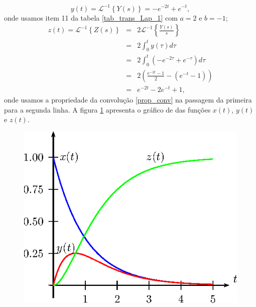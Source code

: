 \begin{equation}
y(t)=\mathcal{L}^{-1}\left\{Y(s)\right\}=-e^{-2t}+e^{-t},
\end{equation}
onde usamos item 11 da tabela \ref{tab_trans_Lap_1} com $a=2$ e $b=-1$;
\begin{eqnarray*}
z(t)=\mathcal{L}^{-1}\left\{Z(s)\right\}&=&2\mathcal{L}^{-1}\left\{\frac{Y(s)}{s}\right\}\\&=&2\int_0^ty(\tau)d\tau\\
&=&2\int_0^t\left(-e^{-2\tau}+e^{-\tau}\right)d\tau\\&=&2\left(\frac{e^{-2t}-1}{2}-\left(e^{-t}-1\right)\right)\\&=&e^{-2t}-2e^{-t}+1,
\end{eqnarray*}
 onde usamos a propriedade da convolução \ref{prop_conv} na passagem da primeira para a segunda linha. A figura \ref{reacao} apresenta o gráfico de das funções $x(t)$, $y(t)$ e $z(t)$.
 \begin{figure}[!ht]
\begin{center}

\includegraphics{cap_sistemas/pics/figura_4}\end{center}
\caption{\label{reacao}}
\end{figure}



